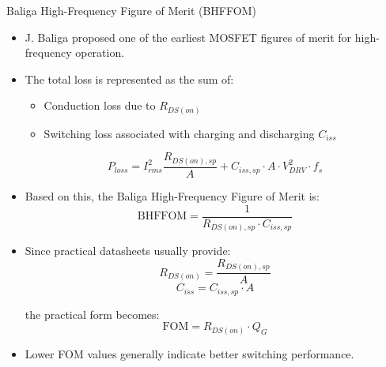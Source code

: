\begin{frame}{Baliga High-Frequency Figure of Merit (BHFFOM)}
\begin{itemize}
    \item J. Baliga proposed one of the earliest MOSFET figures of merit for high-frequency operation.
    \item The total loss is represented as the sum of:
    \begin{itemize}
        \item Conduction loss due to $R_{DS(on)}$
        \item Switching loss associated with charging and discharging $C_{iss}$
    \end{itemize}

    \vspace{0.2cm}

    \[
    P_{loss}
    =
    I_{rms}^2\frac{R_{DS(on),sp}}{A}
    +
    C_{iss,sp}\cdot A \cdot V_{DRV}^2 \cdot f_s
    \]

    \item Based on this, the Baliga High-Frequency Figure of Merit is:
    \[
    \text{BHFFOM}
    =
    \frac{1}{R_{DS(on),sp}\cdot C_{iss,sp}}
    \]

    \item Since practical datasheets usually provide:
    \[
    R_{DS(on)}=\frac{R_{DS(on),sp}}{A}
    \]
    \[
    C_{iss}=C_{iss,sp}\cdot A
    \]

    the practical form becomes:
    \[
    \boxed{
    \text{FOM}=R_{DS(on)}\cdot Q_G
    }
    \]

    \item Lower FOM values generally indicate better switching performance.
\end{itemize}
\end{frame}



